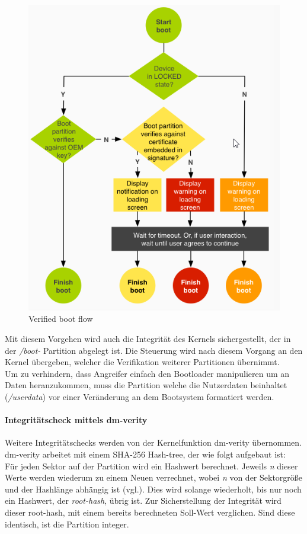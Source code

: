 	\begin{figure}[h]
		\centering
		\includegraphics[width=0.7\linewidth, height=0.5\textheight]{android_pages/graphics/VerifiedBoot}
		\caption[Verified boot flow\protect\cite{VerifyingBoot}]{Verified boot flow\protect\cite{VerifyingBoot}}
		\label{fig:VerifiedBoot}
	\end{figure}
	
\begin{flushleft}
	Mit diesem Vorgehen wird auch die Integrität des Kernels sichergestellt, der in der \textit{/boot-} Partition abgelegt ist. Die Steuerung wird nach diesem Vorgang an den Kernel übergeben, welcher die Verifikation weiterer Partitionen übernimmt.\newline\\

	Um zu verhindern, dass Angreifer einfach den Bootloader manipulieren um an Daten heranzukommen, muss die Partition welche die Nutzerdaten beinhaltet (\textit{/userdata}) vor einer Veränderung an dem Bootsystem formatiert werden.
\end{flushleft}
	
	\paragraph{Integritätscheck mittels dm-verity}
	Weitere Integritätschecks werden von der Kernelfunktion dm-verity übernommen.
	dm-verity arbeitet mit einem SHA-256 Hash-tree, der wie folgt aufgebaut ist:\\
	Für jeden Sektor auf der Partition wird ein Hashwert berechnet. Jeweils \textit{n} dieser Werte werden wiederum zu einem Neuen verrechnet, wobei \textit{n} von der Sektorgröße und der Hashlänge abhängig ist (vgl.\cite{dm-verity-doc}). Dies wird solange wiederholt, bis nur noch ein Hashwert, der \textit{root-hash}, übrig ist. Zur Sicherstellung der Integrität wird dieser root-hash, mit einem bereits berechneten Soll-Wert verglichen. Sind diese identisch, ist die Partition integer.
	
